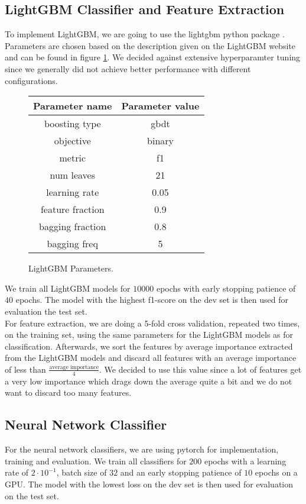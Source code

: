 \subsection{LightGBM Classifier and Feature Extraction}
To implement LightGBM, we are going to use the lightgbm python package \cite{lgbmpython}. Parameters are chosen based on the description given on the LightGBM website \cite{lgbmpython} and can be found in figure \ref{fig:lgbmparams}. We decided against extensive hyperparamter tuning since we generally did not achieve better performance with different configurations.

\begin{figure}[H]
  \begin{center}
   	\begin{tabular}{|| c | c ||}
   	\hline
   	Parameter name & Parameter value \\
   	\hline\hline
   	boosting type & gbdt \\
 	\hline
 	objective & binary \\
 	\hline
 	metric & f1 \\
 	\hline
 	num leaves & 21 \\
 	\hline
 	learning rate & 0.05 \\
 	\hline
 	feature fraction & 0.9 \\
 	\hline
 	bagging fraction & 0.8 \\
 	\hline
 	bagging freq & 5 \\
 	\hline
	\end{tabular}
  \end{center}
  \caption{LightGBM Parameters.}%
  \label{fig:lgbmparams}
\end{figure}

We train all LightGBM models for $10000$ epochs with early stopping patience of $40$ epochs. The model with the highest f1-score on the dev set is then used for evaluation the test set. \\
For feature extraction, we are doing a 5-fold cross validation, repeated two times, on the training set, using the same parameters for the LightGBM models as for classification. Afterwards, we sort the features by average importance extracted from the LightGBM models and discard all features with an average importance of less than $\frac{\text{average importance}}{4}$. We decided to use this value since a lot of features get a very low importance which drags down the average quite a bit and we do not want to discard too many features.


\subsection{Neural Network Classifier}
For the neural network classifiers, we are using pytorch \cite{pytorch} for implementation, training and evaluation. We train all classifiers for $200$ epochs with a learning rate of $2 \cdot 10^{-1}$, batch size of $32$ and an early stopping patience of $10$ epochs on a GPU. The model with the lowest loss on the dev set is then used for evaluation on the test set.

